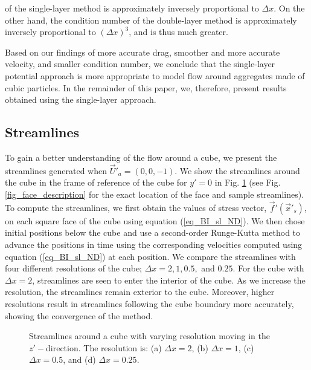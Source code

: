 of the single-layer method is approximately inversely proportional to $\Delta x$. 
On the other hand, the condition number of the double-layer method is approximately inversely proportional to $(\Delta x)^{3}$, and is thus much greater.
\par
Based on our findings of more accurate drag, smoother and more accurate velocity, and smaller condition number,  we conclude that the single-layer potential approach is more appropriate to model flow around aggregates made of cubic particles. 
In the remainder of this paper, we, therefore, present results obtained using the single-layer approach.
\subsection{Streamlines} 
\label{ch_streamlines}
To gain a better understanding of the flow around a cube, we present the streamlines generated when $\vec{U}'_a = (0,0,-1)$. We show the streamlines around the cube in the frame of reference of the cube for $y' = 0$ in Fig.  \ref{fig_strlns} 
(see Fig. \ref{fig_face_description} for the exact location of the face and sample streamlines).
To compute the streamlines, we first obtain the values of stress vector, $\vec{f}'(\vec{x}'_s)$, on each square face of the cube using equation (\ref{eq_BI_sl_ND}).
We then chose initial positions below the cube and use a second-order Runge-Kutta method to advance the positions in time using the corresponding velocities computed using equation (\ref{eq_BI_sl_ND}) at each position. 
We compare the streamlines with four different resolutions of the cube; $\Delta x = 2,1, 0.5,$ and $0.25$. For the cube with $\Delta x = 2$, streamlines are seen to enter the interior of the cube. As we increase the resolution, the streamlines remain exterior to the cube.
Moreover, higher resolutions result in streamlines following the cube boundary more accurately, showing the convergence of the method.
\begin{figure}[ht]
	\begin{center}
	\end{center}
	\caption{Streamlines around a cube with varying resolution moving in the $z'-$direction. The resolution is: (a) $\Delta x = 2$, (b) $\Delta x = 1$, (c) $\Delta x  =0.5$, and (d) $ \Delta x =0.25$. }
	\label{fig_strlns}
\end{figure}
